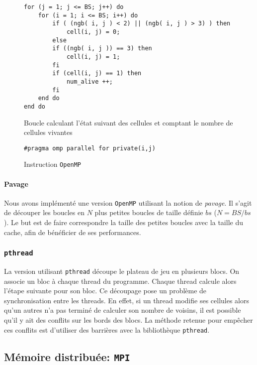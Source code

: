 \begin{figure}[h!]
\begin{lstlisting}
for (j = 1; j <= BS; j++) do
	for (i = 1; i <= BS; i++) do
		if ( (ngb( i, j ) < 2) || (ngb( i, j ) > 3) ) then
			cell(i, j) = 0;
		else 
		if ((ngb( i, j )) == 3) then
			cell(i, j) = 1;
		fi
		if (cell(i, j) == 1) then
			num_alive ++;
		fi
	end do
end do
\end{lstlisting}
\caption{Boucle calculant l'état suivant des cellules et comptant le nombre de cellules vivantes}
\label{boucle_actualisation}
\end{figure}

\begin{figure}[h!]
\begin{lstlisting}
#pragma omp parallel for private(i,j)
\end{lstlisting}
\caption{Instruction \texttt{OpenMP}}
\label{omp_parallel}
\end{figure}

\paragraph{Pavage}
\label{pavage}
Nous avons implémenté une version \texttt{OpenMP} utilisant la notion de \emph{pavage}. Il s'agit de découper les boucles en $N$ plus petites boucles de taille définie $bs$ ($N = BS/bs$). Le but est de faire correspondre la taille des petites boucles avec la taille du cache, afin de bénéficier de ses performances. 

\subsubsection{\texttt{pthread}}
\label{pthread}

La version utilisant \texttt{pthread} découpe le plateau de jeu en plusieurs blocs. On associe un bloc à chaque thread du programme. Chaque thread calcule alors l'étape suivante pour son bloc. Ce découpage pose un problème de synchronisation entre les threads. En effet, si un thread modifie ses cellules alors qu'un autres n'a pas terminé de calculer son nombre de voisins, il est possible qu'il y ait des conflits sur les bords des blocs. La méthode retenue pour empêcher ces conflits est d'utiliser des barrières avec la bibliothèque \texttt{pthread}.

\subsection{Mémoire distribuée: \texttt{MPI}} %
\label{mpi}

